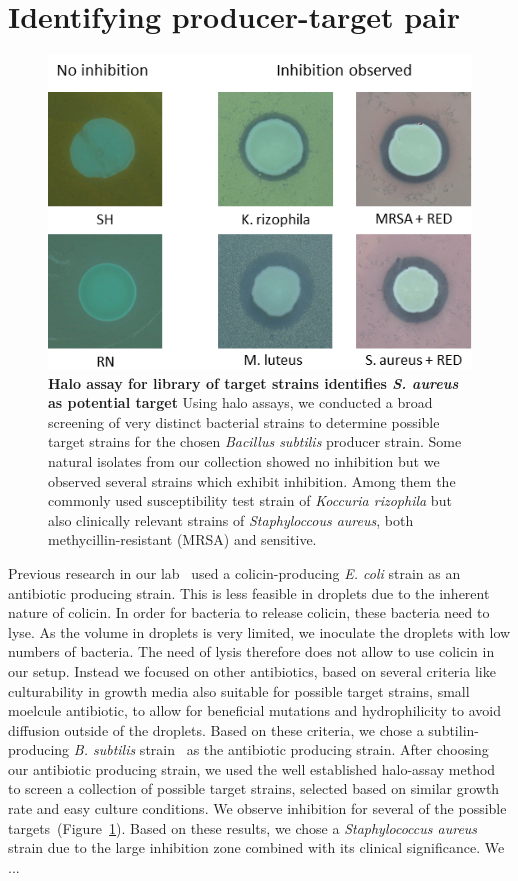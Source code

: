 \section{Identifying producer-target pair}
\begin{figure}
\centering
\includegraphics[width=\linewidth]{graphics/2025_09_28_droplets_fig4.png}
\caption{\textbf{Halo assay for library of target strains identifies \textit{S. aureus} as potential target} Using halo assays, we conducted a broad screening of very distinct bacterial strains to determine possible target strains for the chosen \textit{Bacillus subtilis} producer strain. Some natural isolates from our collection showed no inhibition but we observed several strains which exhibit inhibition. Among them the commonly used susceptibility test strain of \textit{Koccuria rizophila} but also clinically relevant strains of \textit{Staphyloccous aureus}, both methycillin-resistant (MRSA) and sensitive.}
\label{fig:results_sensitive_screening}
\end{figure}
Previous research in our lab~\cite{Gerardin2016-ac} used a colicin-producing \textit{E. coli} strain as an antibiotic producing strain. This is less feasible in droplets due to the inherent nature of colicin. In order for bacteria to release colicin, these bacteria need to lyse. As the volume in droplets is very limited, we inoculate the droplets with low numbers of bacteria. The need of lysis therefore does not allow to use colicin in our setup.
Instead we focused on other antibiotics, based on several criteria like culturability in growth media also suitable for possible target strains, small moelcule antibiotic, to allow for beneficial mutations and hydrophilicity to avoid diffusion outside of the droplets. Based on these criteria, we chose a subtilin-producing \textit{B. subtilis} strain~\cite{Stein2002-nv, Zhang2022-ee} as the antibiotic producing strain.
After choosing our antibiotic producing strain, we used the well established halo-assay method to screen a collection of possible target strains, selected based on similar growth rate and easy culture conditions. We observe inhibition for several of the possible targets~(Figure~\ref{fig:results_sensitive_screening}). Based on these results, we chose a \textit{Staphylococcus aureus} strain due to the large inhibition zone combined with its clinical significance. We ...

